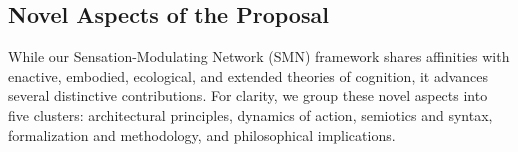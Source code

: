 %

 
\subsection{Novel Aspects of the Proposal}

While our Sensation-Modulating Network (SMN) framework shares affinities with enactive, embodied, ecological, and extended theories of cognition, it advances several distinctive contributions. For clarity, we group these novel aspects into five clusters: architectural principles, dynamics of action, semiotics and syntax, formalization and methodology, and philosophical implications. 

